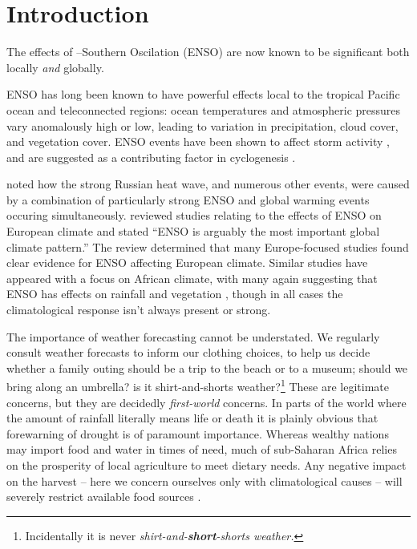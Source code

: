 \section{Introduction}

The effects of \elnino{}--Southern Oscilation (ENSO) are now known to be
significant both locally \emph{and} globally.

ENSO has long been known to have powerful effects local to the tropical Pacific
ocean and teleconnected regions: ocean temperatures and atmospheric pressures
vary anomalously high or low, leading to variation in precipitation, cloud
cover, and vegetation cover. ENSO events have been shown to affect storm
activity \citep{wang2002}, and are suggested as a contributing factor in
cyclogenesis \citep{sobel2000}.

\cite{trenberth2012} noted how the strong Russian heat wave, and numerous
other events, were caused by a combination of particularly strong ENSO and
global warming events occuring simultaneously. \cite{bronnimann2007} reviewed
studies relating to the effects of ENSO on European climate and stated ``ENSO is
arguably the most important global climate pattern.'' The review determined that
many Europe-focused studies found clear evidence for ENSO affecting European
climate. Similar studies have appeared with a focus on African climate, with
many again suggesting that ENSO has effects on rainfall \citep{kane2009} and
vegetation \citep{anyamba1996, anyamba2001, anyamba2002}, though in all cases
the climatological response isn't always present or strong.

\vspace{1cm}

The importance of weather forecasting cannot be understated. We regularly
consult weather forecasts to inform our clothing choices, to help us decide
whether a family outing should be a trip to the beach or to a museum; should we
bring along an umbrella? is it shirt-and-shorts weather?\footnote{Incidentally
  it is never \emph{shirt-and-\textbf{short}-shorts weather.}} These are
legitimate concerns, but they are decidedly \emph{first-world} concerns. In
parts of the world where the amount of rainfall literally means life or death it
is plainly obvious that forewarning of drought is of paramount importance.
Whereas wealthy nations may import food and water in times of need, much of
sub-Saharan Africa relies on the prosperity of local agriculture to meet dietary
needs. Any negative impact on the harvest -- here we concern ourselves only with
climatological causes -- will severely restrict available food sources
\citep{development2006mapping}.

